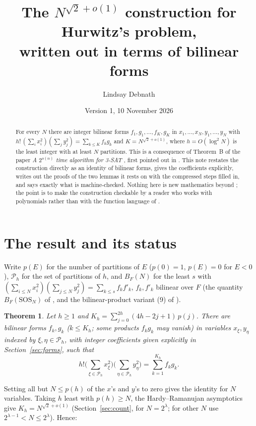 \documentclass[11pt]{amsart}
\title[The $N^{\sqrt2+o(1)}$ construction for Hurwitz's problem]{The $N^{\sqrt2+o(1)}$ construction for Hurwitz's problem,\\ written out in terms of bilinear forms}
\author{Lindsay Debnath}
\date{Version 1, 10 November 2026}
\newtheorem{theorem}{Theorem}
\theoremstyle{remark}
\newcommand{\cP}{\mathcal{P}}
\begin{document}
\maketitle

\begin{abstract}
For every $N$ there are integer bilinear forms $f_1,g_1,\dots,f_K,g_K$ in $x_1,\dots,x_N,y_1,\dots,y_N$ with
$h!\,(\sum_i x_i^2)(\sum_j y_j^2)=\sum_{k\le K} f_kg_k$ and $K=N^{\sqrt2+o(1)}$, where $h=O(\log^2N)$ is the least
integer with at least $N$ partitions. This is a consequence of
Theorem~B of the paper \emph{A $2^{o(n)}$ time algorithm for 3-SAT} \cite{ETH}, first pointed out in
\cite{Sie}. This note restates the construction directly as an identity of bilinear forms, gives the coefficients
explicitly, writes out the proofs of the two lemmas it rests on with the compressed steps filled in, and says
exactly what is machine-checked. Nothing here is new mathematics beyond \cite{ETH}; the point is to make the
construction checkable by a reader who works with polynomials rather than with the function language of \cite{ETH}.
\end{abstract}

\section{The result and its status}

Write $p(E)$ for the number of partitions of $E$ ($p(0)=1$, $p(E)=0$ for $E<0$), $\cP_h$ for the set of
partitions of $h$, and $B_F(N)$ for the least $s$ with $(\sum_{i\le N}x_i^2)(\sum_{j\le N}y_j^2)=\sum_{k\le s}f_kf'_k$,
$f_k,f'_k$ bilinear over $F$ (the quantity $B_F(\mathrm{SOS}_N)$ of \cite{HWY}, and the bilinear-product variant (9) of \cite{Hru}).

\begin{theorem}\label{thm:main}
Let $h\ge1$ and $K_h=\sum_{j=0}^{2h}(4h-2j+1)\,p(j)$. There are bilinear forms $f_k,g_k$ ($k\le K_h$; some
products $f_kg_k$ may vanish) in
variables $x_\xi,y_\eta$ indexed by $\xi,\eta\in\cP_h$, with integer coefficients given explicitly in
Section~\ref{sec:forms}, such that
\[
  h!\Big(\sum_{\xi\in\cP_h}x_\xi^2\Big)\Big(\sum_{\eta\in\cP_h}y_\eta^2\Big)=\sum_{k=1}^{K_h}f_kg_k .
\]
\end{theorem}

Setting all but $N\le p(h)$ of the $x$'s and $y$'s to zero gives the identity for $N$ variables. Taking $h$ least
with $p(h)\ge N$, the Hardy--Ramanujan asymptotics give $K_h=N^{\sqrt2+o(1)}$ (Section~\ref{sec:count}, for $N=2^\lambda$;
for other $N$ use $2^{\lambda-1}<N\le2^\lambda$). Hence:
\end{document}
